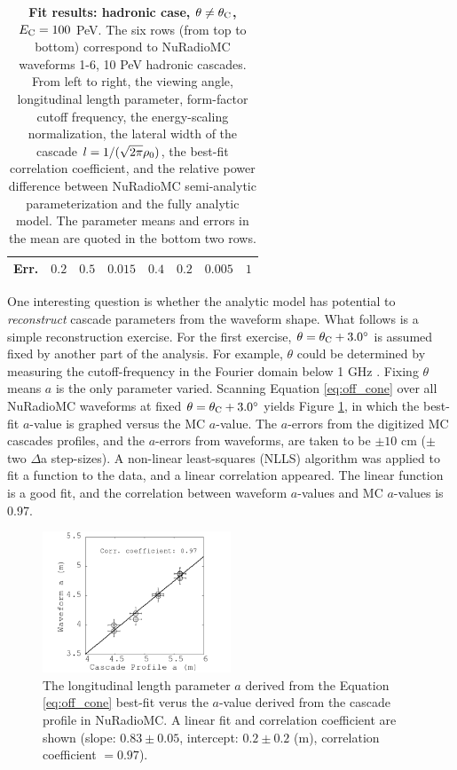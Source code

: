 \documentclass[amsmath,amssymb,aps,prd,10pt,twocolumn]{revtex4}
\begin{document}
\begin{table}
\begin{tabular}{|c|c|c|c|c|c|c|c|}
Err. & $0.2$ & $0.5$ & $0.015$ & $0.4$ & $0.2$ & $0.005$ & $1$ \\
\hline
\end{tabular}
\caption{\label{fit:tab:offcone_had} \textbf{Fit results: hadronic case, $\theta \neq \theta_{\rm C}$, $E_{\rm C} = 100$} PeV.  The six rows (from top to bottom) correspond to NuRadioMC waveforms 1-6, 10 PeV hadronic cascades.  From left to right, the viewing angle, longitudinal length parameter, form-factor cutoff frequency, the energy-scaling normalization, the lateral width of the cascade $l = 1/(\sqrt{2\pi} \rho_{\rm 0})$, the best-fit correlation coefficient, and the relative power difference between NuRadioMC semi-analytic parameterization and the fully analytic model.  The parameter means and errors in the mean are quoted in the bottom two rows.}
\end{table}
\endgroup

One interesting question is whether the analytic model has potential to \textit{reconstruct} cascade parameters from the waveform shape.  What follows is a simple reconstruction exercise.  For the first exercise, $\theta = \theta_{\rm C} + 3.0^{\circ}$ is assumed fixed by another part of the analysis.  For example, $\theta$ could be determined by measuring the cutoff-frequency in the Fourier domain below 1 GHz \cite{10.1016/j.astropartphys.2017.03.008}.  Fixing $\theta$ means $a$ is the only parameter varied.  Scanning Equation \ref{eq:off_cone} over all NuRadioMC waveforms at fixed $\theta=\theta_{\rm C} + 3.0^{\circ}$ yields Figure \ref{fit:fig:a_vs_a}, in which the best-fit $a$-value is graphed versus the MC $a$-value.  The $a$-errors from the digitized MC cascades profiles, and the $a$-errors from waveforms, are taken to be $\pm 10$ cm ($\pm$ two $\Delta$a step-sizes).  A non-linear least-squares (NLLS) algorithm was applied to fit a function to the data, and a linear correlation appeared.  The linear function is a good fit, and the correlation between waveform $a$-values and MC $a$-values is 0.97.

\begin{figure}
\centering
\includegraphics[width=0.5\textwidth]{Sept27_plot1.png}
\caption{\label{fit:fig:a_vs_a} The longitudinal length parameter $a$ derived from the Equation \ref{eq:off_cone} best-fit verus the $a$-value derived from the cascade profile in NuRadioMC.  A linear fit and correlation coefficient are shown (slope: $0.83\pm 0.05$, intercept: $0.2\pm 0.2$ (m), correlation coefficient $= 0.97$).}
\end{figure}
\end{document}
